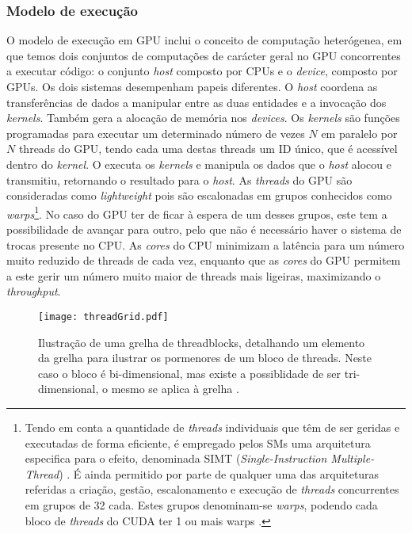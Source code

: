 \subsubsection{Modelo de execução}
\label{exec}
O modelo de execução em GPU inclui o conceito de computação heterógenea, em que temos dois conjuntos de computações de carácter geral no GPU concorrentes a executar código: o conjunto \textit{host} composto por CPUs e o \textit{device}, composto por GPUs. Os dois sistemas desempenham papeis diferentes. O \textit{host} coordena as transferências de dados a manipular entre as duas entidades e a invocação dos \textit{kernels}. Também gera a alocação de memória nos \textit{devices}.
Os \textit{kernels} são funções programadas para executar um determinado número de vezes $N$ em paralelo por $N$ threads do GPU, tendo cada uma destas threads um ID único, que é acessível dentro do \textit{kernel}. O  executa os \textit{kernels} e manipula os dados que o \textit{host} alocou e transmitiu, retornando o resultado para o \textit{host}.
 As  \textit{threads} do GPU são consideradas como \textit{lightweight} pois são escalonadas em grupos conhecidos como \textit{warps}\cite{cudaProgGuide}\footnote[1] {Tendo em conta a quantidade de  \textit{threads} individuais que têm de ser geridas e executadas de forma eficiente, é empregado pelos SMs uma arquitetura especifica para o efeito, denominada SIMT (\textit{Single-Instruction Multiple-Thread}) \cite{nvidiaTesla}.
É ainda permitido por parte de qualquer uma das arquiteturas referidas a criação, gestão, escalonamento e execução de  \textit{threads} concurrentes em grupos de 32 cada. Estes grupos denominam-se \textit{warps}, podendo cada bloco de  \textit{threads} do CUDA ter 1 ou mais warps
\cite{nickolls2010gpu}.}. No caso do GPU ter de ficar à espera de um desses grupos, este tem a possibilidade de avançar para outro, pelo que não é necessário haver o sistema de trocas presente no CPU. As \textit{cores} do CPU minimizam a latência para um número muito reduzido de threads de cada vez, enquanto que as \textit{cores} do GPU permitem a este gerir um número muito maior de threads mais ligeiras, maximizando o \textit{throughput}.
  \begin{figure}[ht]
  \centering
    {\texttt{[image: threadGrid.pdf]}}
  \caption{Ilustração de uma grelha de threadblocks, detalhando um elemento da grelha para ilustrar os pormenores de um bloco de threads. Neste caso o bloco é bi-dimensional, mas existe a possiblidade de ser tri-dimensional, o mesmo se aplica à grelha \cite{cpg}.}
  \label{threadGrid}
\end{figure}
